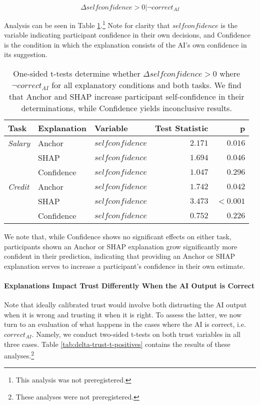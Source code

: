 \begin{equation}
    \Delta selfconfidence > 0 | \neg correct_{AI}
\end{equation}

Analysis can be seen in Table \ref{tab:delta-confidence-t}.\footnote{This analysis was not preregistered.} Note for clarity that $selfconfidence$ is the variable indicating participant confidence in their own decisions, and Confidence is the condition in which the explanation consists of the AI's own confidence in its suggestion.

\begin{table}[htb]
    \centering
    \caption{One-sided t-tests determine whether $\Delta selfconfidence > 0$ where $\neg correct_{AI}$ for all explanatory conditions and both tasks. We find that Anchor and SHAP increase participant self-confidence in their determinations, while Confidence yields inconclusive results.}
    \label{tab:delta-confidence-t}
    \begin{tabular}{lllrr}
        \toprule
        Task & Explanation & Variable & Test Statistic & p \\
        \midrule
        \emph{Salary} & Anchor & $selfconfidence$ & $\mathbf{2.171}$ & $\mathbf{0.016}$ \\
        & SHAP & $selfconfidence$ & $\mathbf{1.694}$ & $\mathbf{0.046}$ \\
        & Confidence & $selfconfidence$ & $1.047$ & $0.296$ \\
        \midrule
        \emph{Credit} & Anchor & $selfconfidence$ & $\mathbf{1.742}$ & $\mathbf{0.042}$ \\
        & SHAP & $selfconfidence$ & $\mathbf{3.473}$ & $\mathbf{<0.001}$ \\
        & Confidence & $selfconfidence$ & $0.752$ & $0.226$ \\
        \bottomrule
    \end{tabular}
\end{table}

We note that, while Confidence shows no significant effects on either task, participants shown an Anchor or SHAP explanation grow significantly more confident in their prediction, indicating that providing an Anchor or SHAP explanation serves to increase a participant's confidence in their own estimate.

\paragraph{Explanations Impact Trust Differently When the AI Output is Correct}
Note that ideally calibrated trust would involve both distrusting the AI output when it is wrong and trusting it when it is right. To assess the latter, we now turn to an evaluation of what happens in the cases where the AI is correct, i.e. $correct_{AI}$. Namely, we conduct two-sided t-tests on both trust variables in all three cases. Table \ref{tab:delta-trust-t-positives} contains the results of these analyses.\footnote{These analyses were not preregistered.}

